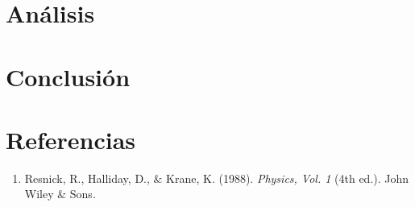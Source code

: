 \documentclass{article}
\begin{document}
\begin{multicols}{2}
\section{Análisis}

\section{Conclusión}

\section{Referencias}
    \begin{enumerate}
    
        \item \label{1} Resnick, R., Halliday, D., \& Krane, K. (1988). \textit{Physics, Vol. 1} (4th ed.). John Wiley \& Sons. 
    
    \end{enumerate}
\end{multicols}
\end{document}
